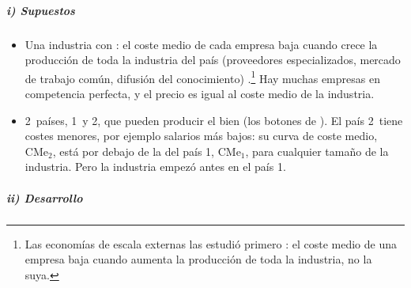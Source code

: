 \documentclass[11pt]{article}
\begin{document}
\subparagraph{i) Supuestos}

\begin{itemize}
\item Una industria con : el coste medio de cada empresa baja cuando crece la producción de toda la industria del país (proveedores especializados, mercado de trabajo común, difusión del conocimiento) .\footnote{Las economías de escala externas las estudió primero \textcite{Marshall1890Principles}: el coste medio de una empresa baja cuando aumenta la producción de toda la industria, no la suya.} Hay muchas empresas en competencia perfecta, y el precio es igual al coste medio de la industria.
\item 2~países, 1~y 2, que pueden producir el bien (los botones de \textcite[cap.~7]{KrugmanObstfeldMelitz2018International}). El país 2~tiene costes menores, por ejemplo salarios más bajos: su curva de coste medio, $\mathrm{CMe}_2$, está por debajo de la del país 1, $\mathrm{CMe}_1$, para cualquier tamaño de la industria. Pero la industria empezó antes en el país 1.
\end{itemize}

\subparagraph{ii) Desarrollo}
\end{document}

